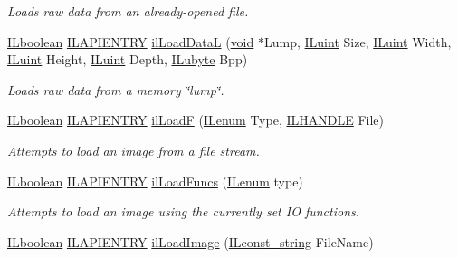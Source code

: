 \begin{DoxyCompactItemize}
\begin{DoxyCompactList}\small\item\em Loads raw data from an already-\/opened file. \end{DoxyCompactList}\item 
\hyperlink{group__il__types_gaa6aa7c95cfdc06b4d8601ef832b7bb0a}{I\+Lboolean} \hyperlink{_i_l_8h_a69c08a8d06df986f7e46f209d131ef2f}{I\+L\+A\+P\+I\+E\+N\+T\+R\+Y} \hyperlink{group__file_gacee512181ef7d072d25862eace4fe568}{il\+Load\+Data\+L} (\hyperlink{_i_l_8h_a5530e04d947bcddd83639ea7940faf10}{void} $\ast$Lump, \hyperlink{group__il__types_gaff8e86a1072c8d7cfe387fb87c6ed8e1}{I\+Luint} Size, \hyperlink{group__il__types_gaff8e86a1072c8d7cfe387fb87c6ed8e1}{I\+Luint} Width, \hyperlink{group__il__types_gaff8e86a1072c8d7cfe387fb87c6ed8e1}{I\+Luint} Height, \hyperlink{group__il__types_gaff8e86a1072c8d7cfe387fb87c6ed8e1}{I\+Luint} Depth, \hyperlink{group__il__types_ga057357939bc5a12e8061715453568519}{I\+Lubyte} Bpp)
\begin{DoxyCompactList}\small\item\em Loads raw data from a memory \char`\"{}lump\char`\"{}. \end{DoxyCompactList}\item 
\hyperlink{group__il__types_gaa6aa7c95cfdc06b4d8601ef832b7bb0a}{I\+Lboolean} \hyperlink{_i_l_8h_a69c08a8d06df986f7e46f209d131ef2f}{I\+L\+A\+P\+I\+E\+N\+T\+R\+Y} \hyperlink{group__file_gaf4026be626ce1e62d6867ccee4afb607}{il\+Load\+F} (\hyperlink{group__il__types_ga62ca73445716183ef42b1f3906a45ed0}{I\+Lenum} Type, \hyperlink{_i_l_8h_a2e3e6f3fab1fa3764f0802258f702d10}{I\+L\+H\+A\+N\+D\+L\+E} File)
\begin{DoxyCompactList}\small\item\em Attempts to load an image from a file stream. \end{DoxyCompactList}\item 
\hyperlink{group__il__types_gaa6aa7c95cfdc06b4d8601ef832b7bb0a}{I\+Lboolean} \hyperlink{_i_l_8h_a69c08a8d06df986f7e46f209d131ef2f}{I\+L\+A\+P\+I\+E\+N\+T\+R\+Y} \hyperlink{group__file_ga156c262317e404e53df7454a064973a3}{il\+Load\+Funcs} (\hyperlink{group__il__types_ga62ca73445716183ef42b1f3906a45ed0}{I\+Lenum} type)
\begin{DoxyCompactList}\small\item\em Attempts to load an image using the currently set I\+O functions. \end{DoxyCompactList}\item 
\hyperlink{group__il__types_gaa6aa7c95cfdc06b4d8601ef832b7bb0a}{I\+Lboolean} \hyperlink{_i_l_8h_a69c08a8d06df986f7e46f209d131ef2f}{I\+L\+A\+P\+I\+E\+N\+T\+R\+Y} \hyperlink{group__file_gace0d235c26455aa9ebe091b0af019a8f}{il\+Load\+Image} (\hyperlink{group__il__types_ga1aa1edc3eb344e14acacb02bade24a5a}{I\+Lconst\+\_\+string} File\+Name)

\end{DoxyCompactItemize}
